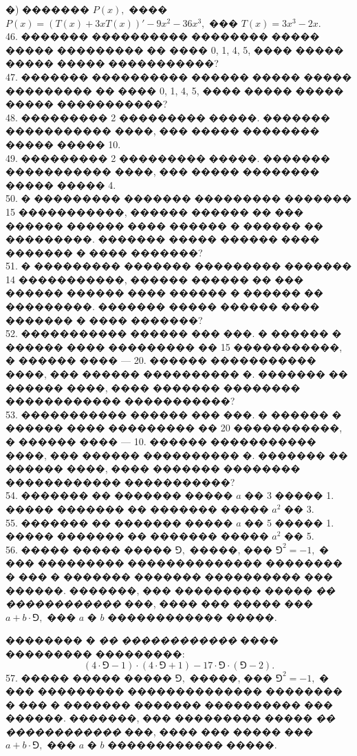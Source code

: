 \documentclass[12pt]{article}
\begin{document}
�) ������� $P(x),$ ���� $P(x)=(T(x)+3xT(x))'-9x^2-36x^3,$ ��� $T(x)=3x^3-2x.$\\
46. ������� ���������� �������� ����� ����� ��������� �� ���� 0, 1, 4, 5, ���� ����� ����� ����� �����������?\\
47. ������� ���������� ������ ����� ����� ��������� �� ���� 0, 1, 4, 5, ���� ����� ����� ����� �����������?\\
48. ��������� 2 ��������� �����. ������� ����������� ����, ��� ����� �������� ����� ����� 10.\\
49. ��������� 2 ��������� �����. ������� ����������� ����, ��� ����� �������� ����� ����� 4.\\
50. � ��������� ������� ��������� ������� 15 �����������, ������ ������ �� ��� ������ ������ ���� ������ � ������ �� ���������. ������� ����� ������ ���� ������� � ���� �������?\\
51. � ��������� ������� ��������� ������� 14 �����������, ������ ������ �� ��� ������ ������ ���� ������ � ������ �� ���������. ������� ����� ������ ���� ������� � ���� �������?\\
52. ����������� ������ ��� ���. � ������ � ������ ���� ��������� �� 15 �����������, � ������ ���� --- 20. ������ ����������� ����, ��� ������ ���������� �. ������� �� ������ ����, ���� ������� �������� ������������ �����������?\\
53. ����������� ������ ��� ���. � ������ � ������ ���� ��������� �� 20 �����������, � ������ ���� --- 10. ������ ����������� ����, ��� ������ ���������� �. ������� �� ������ ����, ���� ������� �������� ������������ �����������?\\
54. ������� �� ������� ����� $a$ �� 3 ����� 1. ����� ������� �� ������� ����� $a^2$ �� 3.\\
55. ������� �� ������� ����� $a$ �� 5 ����� 1. ����� ������� �� ������� ����� $a^2$ �� 5.\\
56. ����� ����� ����� $\Game,$ �����, ��� $\Game^2=-1,$ � ��� ��������� �������������� �������� � ��� � ������� ������� ���������� ��� ������. �������, ��� ��������� ����� {\it �� ������������} ���, ���� ��� ����� ��� $a+b\cdot\Game,$ ��� $a$ � $b$ ������������ �����.

�������� � {\it �� ������������} ���� ��������� ���������:
$$(4\cdot\Game-1)\cdot(4\cdot\Game+1)-17\cdot\Game\cdot(\Game-2).$$
57. ����� ����� ����� $\Game,$ �����, ��� $\Game^2=-1,$ � ��� ��������� �������������� �������� � ��� � ������� ������� ���������� ��� ������. �������, ��� ��������� ����� {\it �� ������������} ���, ���� ��� ����� ��� $a+b\cdot\Game,$ ��� $a$ � $b$ ������������ �����.
\end{document}
